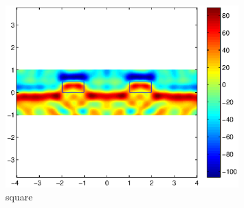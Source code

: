\documentclass[12pt]{iopart}
\begin{document}
\begin{figure}
	\centering
	\includegraphics[width=0.8\textwidth]{./figure_rough/Bisq_multi}
	\caption{square}\label{I1}
\end{figure}
\end{document}
